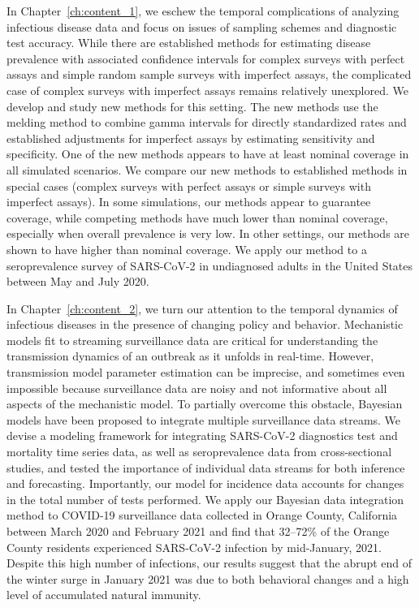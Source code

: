 In Chapter~\ref{ch:content_1}, we eschew the temporal complications of analyzing infectious disease data and focus on issues of sampling schemes and diagnostic test accuracy.
While there are established methods for estimating disease prevalence with associated confidence intervals for complex surveys with perfect assays and simple random sample surveys with imperfect assays, the complicated case of complex surveys with imperfect assays remains relatively unexplored.
We develop and study new methods for this setting.
The new methods use the melding method to combine gamma intervals for directly standardized rates and established adjustments for imperfect assays by estimating sensitivity and specificity.
One of the new methods appears to have at least nominal coverage in all simulated scenarios.
We compare our new methods to established methods in special cases (complex surveys with perfect
assays or simple surveys with imperfect assays).
In some simulations, our methods appear to guarantee coverage, while competing methods have much lower than nominal coverage, especially when overall prevalence is very low.
In other settings, our methods are shown to have higher than nominal coverage.
We apply our method to a seroprevalence survey of SARS-CoV-2 in undiagnosed adults in the United States between May and July 2020.

In Chapter~\ref{ch:content_2}, we turn our attention to the temporal dynamics of infectious diseases in the presence of changing policy and behavior.
Mechanistic models fit to streaming surveillance data are critical for understanding the transmission dynamics of an outbreak as it unfolds in real-time.
However, transmission model parameter estimation can be imprecise, and sometimes even impossible because surveillance data are noisy and not informative about all aspects of the mechanistic model.
To partially overcome this obstacle, Bayesian models have been proposed to integrate multiple surveillance data streams. 
We devise a modeling framework for integrating SARS-CoV-2 diagnostics test and mortality time series data, as well as seroprevalence data from cross-sectional studies, and tested the importance of individual data streams for both inference and forecasting.
Importantly, our model for incidence data accounts for changes in the total number of tests performed.
We apply our Bayesian data integration method to COVID-19 surveillance data collected in Orange County, California between March 2020 and February 2021 and find that 32--72\% of the Orange County residents experienced SARS-CoV-2 infection by mid-January, 2021.
Despite this high number of infections, our results suggest that the abrupt end of the winter surge in January 2021 was due to both behavioral changes and a high level of accumulated natural immunity.

